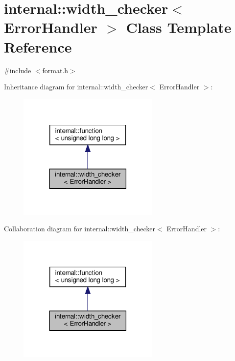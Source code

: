 \hypertarget{classinternal_1_1width__checker}{}\section{internal\+:\+:width\+\_\+checker$<$ Error\+Handler $>$ Class Template Reference}
\label{classinternal_1_1width__checker}


{\ttfamily \#include $<$format.\+h$>$}



Inheritance diagram for internal\+:\+:width\+\_\+checker$<$ Error\+Handler $>$\+:
\nopagebreak
\begin{figure}[H]
\begin{center}
\leavevmode
\includegraphics[width=197pt]{classinternal_1_1width__checker__inherit__graph}
\end{center}
\end{figure}


Collaboration diagram for internal\+:\+:width\+\_\+checker$<$ Error\+Handler $>$\+:
\nopagebreak
\begin{figure}[H]
\begin{center}
\leavevmode
\includegraphics[width=197pt]{classinternal_1_1width__checker__coll__graph}
\end{center}
\end{figure}
